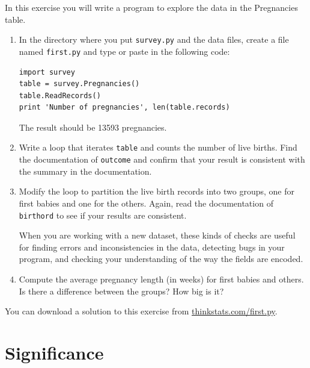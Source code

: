 \documentclass[12pt]{book}
\begin{document}
\begin{exercise}
In this exercise you will write a program to explore the data
in the Pregnancies table.

\begin{enumerate}


\item In the directory where you put {\tt survey.py} and the
data files, create a file named \verb"first.py" and
type or paste in the following code:

\begin{verbatim}
import survey
table = survey.Pregnancies()
table.ReadRecords()
print 'Number of pregnancies', len(table.records)
\end{verbatim}

The result should be 13593 pregnancies.

\item Write a loop that iterates \verb"table" and counts
the number of live births.  Find the documentation of {\tt outcome}
and confirm that your result is consistent with the summary
in the documentation.

\item Modify the loop to partition the live birth records into
two groups, one for first babies and one for the others.  Again,
read the documentation of {\tt birthord} to see if your results
are consistent.

When you are working with a new dataset, these kinds of checks
are useful for finding errors and inconsistencies in the data,
detecting bugs in your program, and checking your understanding
of the way the fields are encoded.

\item Compute the average pregnancy length (in weeks) for first
babies and others.  Is there a difference between the groups?  How
big is it?


\end{enumerate}

You can download a solution to this exercise from
\url{thinkstats.com/first.py}.


\end{exercise}


\section{Significance}
\end{document}
